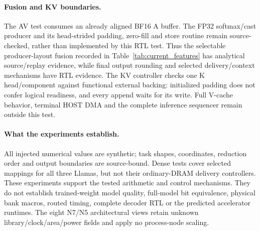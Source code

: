 \paragraph{Fusion and KV boundaries.}
The AV test consumes an already aligned BF16 A buffer.
The FP32 softmax/cast producer and its head-strided padding, zero-fill and store routine remain source-checked, rather than implemented by this RTL test.
Thus the selectable producer-layout fusion recorded in Table~\ref{tab:current_features} has analytical source/replay evidence, while final output rounding and selected delivery/context mechanisms have RTL evidence.
The KV controller checks one K head/component against functional external backing: initialized padding does not confer logical readiness, and every append waits for its write.
Full V-cache behavior, terminal HOST DMA and the complete inference sequencer remain outside this test.

\paragraph{What the experiments establish.}
All injected numerical values are synthetic; task shapes, coordinates, reduction order and output boundaries are source-bound.
Dense tests cover selected mappings for all three Llamas, but not their ordinary-DRAM delivery controllers.
These experiments support the tested arithmetic and control mechanisms.
They do not establish trained-weight model quality, full-model bit equivalence, physical bank macros, routed timing, complete decoder RTL or the predicted accelerator runtimes.
The eight N7/N5 architectural views retain unknown library/clock/area/power fields and apply no process-node scaling.
